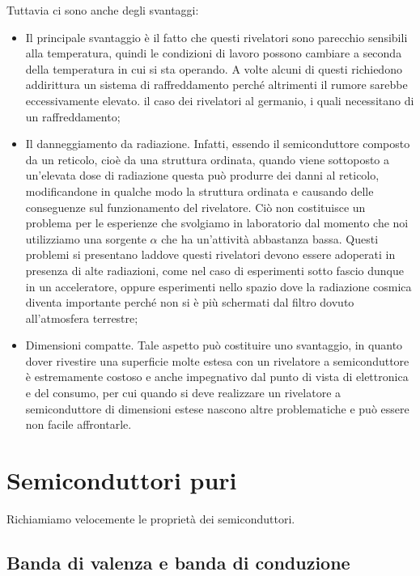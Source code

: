 Tuttavia ci sono anche degli svantaggi:
\begin{itemize}[leftmargin=0.5cm]
   \item Il principale svantaggio è il fatto che questi rivelatori sono parecchio sensibili alla temperatura, quindi le condizioni di lavoro possono cambiare a seconda della temperatura in cui si sta operando. A volte alcuni di questi richiedono addirittura un sistema di raffreddamento perché altrimenti il rumore sarebbe eccessivamente elevato. \E il caso dei rivelatori al germanio, i quali necessitano di un raffreddamento;
   \item Il danneggiamento da radiazione. Infatti, essendo il semiconduttore composto da un reticolo, cioè da una struttura ordinata, quando viene sottoposto a un'elevata dose di radiazione questa può produrre dei danni al reticolo, modificandone in qualche modo la struttura ordinata e causando delle conseguenze sul funzionamento del rivelatore. Ciò non costituisce un problema per le esperienze che svolgiamo in laboratorio dal momento che noi utilizziamo una sorgente $\alpha$ che ha un'attività abbastanza bassa. Questi problemi si presentano laddove questi rivelatori devono essere adoperati in presenza di alte radiazioni, come nel caso di esperimenti sotto fascio dunque in un acceleratore, oppure esperimenti nello spazio dove la radiazione cosmica diventa importante perché non si è più schermati dal filtro dovuto all'atmosfera terrestre;
   \item Dimensioni compatte. Tale aspetto può costituire uno svantaggio, in quanto dover rivestire una superficie molte estesa con un rivelatore a semiconduttore è estremamente costoso e anche impegnativo dal punto di vista di elettronica e del consumo, per cui quando si deve realizzare un rivelatore a semiconduttore di dimensioni estese nascono altre problematiche e può essere non facile affrontarle.
\end{itemize}

\section{Semiconduttori puri}

Richiamiamo velocemente le proprietà dei semiconduttori.

\subsection{Banda di valenza e banda di conduzione}


